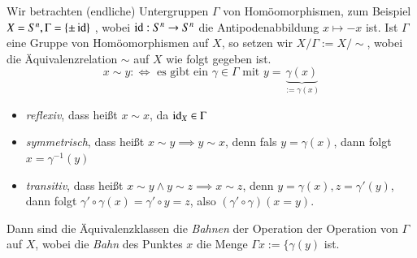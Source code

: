 \documentclass[a4paper,10pt]{scrartcl}
\begin{document}
Wir betrachten (endliche) Untergruppen $\Gamma$ von Homöomorphismen, zum Beispiel $X=S^n, \Gamma=\{\pm \operatorname{id}\}$ , wobei $\operatorname{id}: S^n\to S^n$ die Antipodenabbildung $x\mapsto -x$ ist. Ist $\Gamma$ eine Gruppe von Homöomorphismen auf $X$, so setzen wir $X/\Gamma:=X/\sim$, wobei die Äquivalenzrelation $\sim$ auf $X$ wie folgt gegeben ist.
\[
 x\sim y :\iff \text{ es gibt ein } \gamma\in \Gamma \text{ mit } y=\underbrace{\gamma(x)}_{:=\gamma(x)}
\]
\begin{itemize}
\item \emph{reflexiv}, dass heißt $x\sim x$, da $\operatorname{id}_X\in \Gamma$
\item \emph{symmetrisch}, dass heißt $x\sim y \implies y\sim x$, denn fals $y=\gamma(x)$, dann folgt $x=\gamma^{-1}(y)$
\item \emph{transitiv}, dass heißt $x\sim y \land y\sim z \implies x\sim z$, denn $y=\gamma(x), z=\gamma'(y)$, dann folgt $\gamma'\circ \gamma(x)=\gamma'\circ y=z$, also $(\gamma'\circ \gamma)(x=y)$. 
\end{itemize}
Dann sind die Äquivalenzklassen die \emph{Bahnen} der Operation der Operation von $\Gamma$ auf $X$, wobei die \emph{Bahn} des Punktes $x$ die Menge $\Gamma x:=\{\gamma(y)$ ist.
\end{document}
